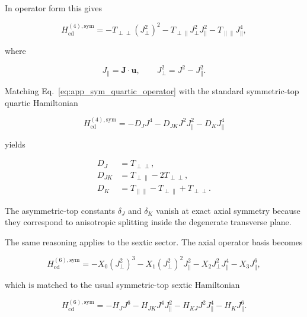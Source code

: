 \documentclass[aip,jcp,reprint,floatfix]{revtex4-2}
\begin{document}
In operator form this gives

\begin{equation}
H_{\mathrm{cd}}^{(4),\mathrm{sym}}
=
-T_{\perp\perp} (J_{\perp}^2)^2
-T_{\perp\parallel} J_{\perp}^2 J_{\parallel}^2
-T_{\parallel\parallel} J_{\parallel}^4,
\label{eq:app_sym_quartic_operator}
\end{equation}

where

\begin{equation}
J_{\parallel} = \mathbf J\!\cdot\!\mathbf u,
\qquad
J_{\perp}^2 = J^2 - J_{\parallel}^2 .
\end{equation}

Matching Eq.~\eqref{eq:app_sym_quartic_operator} with the standard
symmetric-top quartic Hamiltonian

\begin{equation}
H_{\mathrm{cd}}^{(4),\mathrm{sym}}
=
-D_J J^4
-D_{JK} J^2 J_{\parallel}^2
-D_K J_{\parallel}^4
\end{equation}

yields

\begin{align}
D_J &= T_{\perp\perp}, \\
D_{JK} &= T_{\perp\parallel}-2T_{\perp\perp}, \\
D_K &= T_{\parallel\parallel}-T_{\perp\parallel}+T_{\perp\perp}.
\label{eq:app_sym_quartic_constants}
\end{align}

The asymmetric-top constants $\delta_J$ and $\delta_K$ vanish at exact
axial symmetry because they correspond to anisotropic splitting inside
the degenerate transverse plane.

The same reasoning applies to the sextic sector. The axial operator
basis becomes

\begin{equation}
H_{\mathrm{cd}}^{(6),\mathrm{sym}}
=
-X_0 (J_{\perp}^2)^3
-X_1 (J_{\perp}^2)^2 J_{\parallel}^2
-X_2 J_{\perp}^2 J_{\parallel}^4
-X_3 J_{\parallel}^6 ,
\label{eq:app_sym_sextic_operator}
\end{equation}

which is matched to the usual symmetric-top sextic Hamiltonian

\begin{equation}
H_{\mathrm{cd}}^{(6),\mathrm{sym}}
=
-H_J J^6
-H_{JK} J^4 J_{\parallel}^2
-H_{KJ} J^2 J_{\parallel}^4
-H_K J_{\parallel}^6 .
\end{equation}
\end{document}
